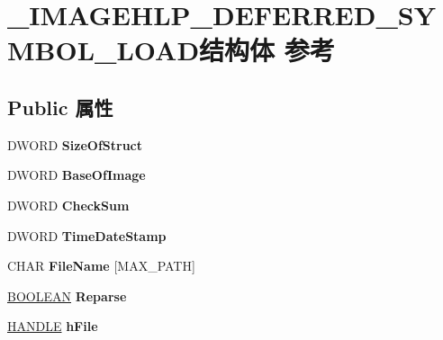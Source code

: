 \hypertarget{struct___i_m_a_g_e_h_l_p___d_e_f_e_r_r_e_d___s_y_m_b_o_l___l_o_a_d}{}\section{\+\_\+\+I\+M\+A\+G\+E\+H\+L\+P\+\_\+\+D\+E\+F\+E\+R\+R\+E\+D\+\_\+\+S\+Y\+M\+B\+O\+L\+\_\+\+L\+O\+A\+D结构体 参考}
\label{struct___i_m_a_g_e_h_l_p___d_e_f_e_r_r_e_d___s_y_m_b_o_l___l_o_a_d}
\subsection*{Public 属性}
\begin{DoxyCompactItemize}
\item 
\mbox{\label{struct___i_m_a_g_e_h_l_p___d_e_f_e_r_r_e_d___s_y_m_b_o_l___l_o_a_d_aaae921e39edeb1c232003554dc87bc23}} 
D\+W\+O\+RD {\bfseries Size\+Of\+Struct}
\item 
\mbox{\label{struct___i_m_a_g_e_h_l_p___d_e_f_e_r_r_e_d___s_y_m_b_o_l___l_o_a_d_aa56b5740543db97a14ec4ce8edc4ba60}} 
D\+W\+O\+RD {\bfseries Base\+Of\+Image}
\item 
\mbox{\label{struct___i_m_a_g_e_h_l_p___d_e_f_e_r_r_e_d___s_y_m_b_o_l___l_o_a_d_ada7440317af74ed5ce74194fffa8e234}} 
D\+W\+O\+RD {\bfseries Check\+Sum}
\item 
\mbox{\label{struct___i_m_a_g_e_h_l_p___d_e_f_e_r_r_e_d___s_y_m_b_o_l___l_o_a_d_a388a60f82a20997fd2f99877a8edc5c2}} 
D\+W\+O\+RD {\bfseries Time\+Date\+Stamp}
\item 
\mbox{\label{struct___i_m_a_g_e_h_l_p___d_e_f_e_r_r_e_d___s_y_m_b_o_l___l_o_a_d_ad3f7f495f7c8c3b217d2489c94a6d332}} 
C\+H\+AR {\bfseries File\+Name} \mbox{[}M\+A\+X\+\_\+\+P\+A\+TH\mbox{]}
\item 
\mbox{\label{struct___i_m_a_g_e_h_l_p___d_e_f_e_r_r_e_d___s_y_m_b_o_l___l_o_a_d_a91921ce416fffa17484cfe604d4fca2f}} 
\hyperlink{_processor_bind_8h_a112e3146cb38b6ee95e64d85842e380a}{B\+O\+O\+L\+E\+AN} {\bfseries Reparse}
\item 
\mbox{\label{struct___i_m_a_g_e_h_l_p___d_e_f_e_r_r_e_d___s_y_m_b_o_l___l_o_a_d_ace7f7c8fdf141aa7a5b90f33ede8040a}} 
\hyperlink{interfacevoid}{H\+A\+N\+D\+LE} {\bfseries h\+File}
\end{DoxyCompactItemize}


